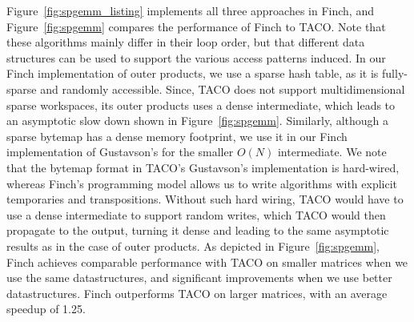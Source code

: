 Figure~\ref{fig:spgemm_listing} implements all three approaches in Finch, and Figure~\ref{fig:spgemm} compares the performance of Finch to TACO.
%
Note that these algorithms mainly differ in their loop order, but that different data structures can be used to support the various access patterns induced.
%
In our Finch implementation of outer products, we use a sparse hash table, as it is fully-sparse and randomly accessible.
%
Since, TACO does not support multidimensional sparse workspaces, its outer products uses a dense intermediate, which leads to an asymptotic slow down shown in Figure~\ref{fig:spgemm}.
%
Similarly, although a sparse bytemap has a dense memory footprint, we use it in our Finch implementation of Gustavson's for the smaller $O(N)$ intermediate.
%
We note that the bytemap format in TACO's Gustavson's implementation is hard-wired, whereas Finch's programming model allows us to write algorithms with explicit temporaries and transpositions.
%
Without such hard wiring, TACO would have to use a dense intermediate to support random writes, which TACO would then propagate to the output, turning it dense and leading to the same asymptotic results as in the case of outer products. 
%
As depicted in Figure~\ref{fig:spgemm}, Finch achieves comparable performance with TACO on smaller matrices when we use the same datastructures, and significant improvements when we use better datastructures. 
%
Finch outperforms TACO on larger matrices, with an average speedup of 1.25. %

